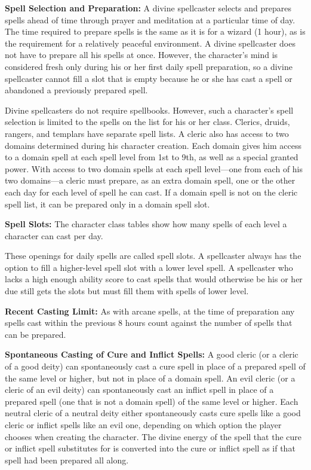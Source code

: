 \textbf{Spell Selection and Preparation:} A divine spellcaster selects and prepares spells ahead of time through prayer and meditation at a particular time of day. The time required to prepare spells is the same as it is for a wizard (1 hour), as is the requirement for a relatively peaceful environment. A divine spellcaster does not have to prepare all his spells at once. However, the character's mind is considered fresh only during his or her first daily spell preparation, so a divine spellcaster cannot fill a slot that is empty because he or she has cast a spell or abandoned a previously prepared spell.

Divine spellcasters do not require spellbooks. However, such a character's spell selection is limited to the spells on the list for his or her class. Clerics, druids, rangers, and templars have separate spell lists. A cleric also has access to two domains determined during his character creation. Each domain gives him access to a domain spell at each spell level from 1st to 9th, as well as a special granted power. With access to two domain spells at each spell level---one from each of his two domains---a cleric must prepare, as an extra domain spell, one or the other each day for each level of spell he can cast. If a domain spell is not on the cleric spell list, it can be prepared only in a domain spell slot.

\textbf{Spell Slots:} The character class tables show how many spells of each level a character can cast per day.

These openings for daily spells are called spell slots. A spellcaster always has the option to fill a higher-level spell slot with a lower level spell. A spellcaster who lacks a high enough ability score to cast spells that would otherwise be his or her due still gets the slots but must fill them with spells of lower level.

\textbf{Recent Casting Limit:} As with arcane spells, at the time of preparation any spells cast within the previous 8 hours count against the number of spells that can be prepared.

\textbf{Spontaneous Casting of Cure and Inflict Spells:} A good cleric (or a cleric of a good deity) can spontaneously cast a cure spell in place of a prepared spell of the same level or higher, but not in place of a domain spell. An evil cleric (or a cleric of an evil deity) can spontaneously cast an inflict spell in place of a prepared spell (one that is not a domain spell) of the same level or higher. Each neutral cleric of a neutral deity either spontaneously casts cure spells like a good cleric or inflict spells like an evil one, depending on which option the player chooses when creating the character. The divine energy of the spell that the cure or inflict spell substitutes for is converted into the cure or inflict spell as if that spell had been prepared all along.

